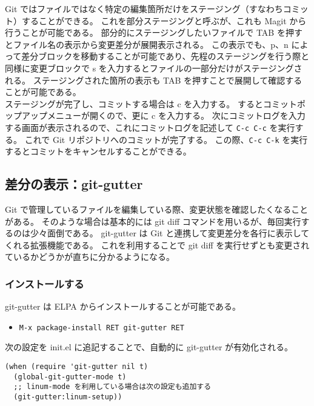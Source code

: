 Git ではファイルではなく特定の編集箇所だけをステージング（すなわちコミット）することができる。
これを部分ステージングと呼ぶが、これも Magit から行うことが可能である。
部分的にステージングしたいファイルで TAB を押すとファイル名の表示から変更差分が展開表示される。
この表示でも、p、n によって差分ブロックを移動することが可能であり、先程のステージングを行う際と同様に変更ブロックで s を入力するとファイルの一部分だけがステージングされる。
ステージングされた箇所の表示も TAB を押すことで展開して確認することが可能である。\\

ステージングが完了し、コミットする場合は c を入力する。
するとコミットポップアップメニューが開くので、更に c を入力する。
次にコミットログを入力する画面が表示されるので、これにコミットログを記述して \texttt{C-c C-c} を実行する。
これで Git リポジトリへのコミットが完了する。
この際、\texttt{C-c C-k} を実行するとコミットをキャンセルすることができる。
\subsection{差分の表示：git-gutter}
Git で管理しているファイルを編集している際、変更状態を確認したくなることがある。
そのような場合は基本的には git diff コマンドを用いるが、毎回実行するのは少々面倒である。
git-gutter は Git と連携して変更差分を各行に表示してくれる拡張機能である。
これを利用することで git diff を実行せずとも変更されているかどうかが直ちに分かるようになる。
\subsubsection{インストールする}
git-gutter は ELPA からインストールすることが可能である。
\begin{itemize}\setlength{\leftskip}{-1.00zw}%
\item[] \texttt{M-x package-install RET git-gutter RET}
\end{itemize}
次の設定を init.el に追記することで、自動的に git-gutter が有効化される。
\begin{mdframed}[roundcorner=0.50zw,leftmargin=3.00zw,rightmargin=3.00zw,skipabove=0.40zw,skipbelow=0.40zw,innertopmargin=4.00pt,innerbottommargin=4.00pt,innerleftmargin=5.00pt,innerrightmargin=5.00pt,linecolor=gray!020,linewidth=0.50pt,backgroundcolor=gray!20]
\begin{verbatim}
(when (require 'git-gutter nil t)
  (global-git-gutter-mode t)
  ;; linum-mode を利用している場合は次の設定も追加する
  (git-gutter:linum-setup))
\end{verbatim}
\end{mdframed}

